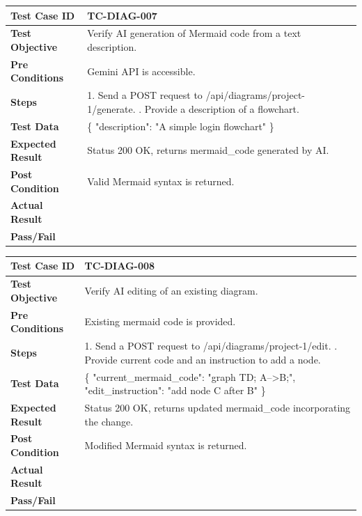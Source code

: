 \begin{longtable}{|p{}|p{}|}
\hline
\textbf{Test Case ID} & TC-DIAG-007 \\ \hline
\textbf{Test Objective} & Verify AI generation of Mermaid code from a text description. \\ \hline
\textbf{Pre Conditions} & Gemini API is accessible. \\ \hline
\textbf{Steps} & 
1. Send a POST request to /api/diagrams/project-1/generate. \newline
2. Provide a description of a flowchart. \\ \hline
\textbf{Test Data} & \{ "description": "A simple login flowchart" \} \\ \hline
\textbf{Expected Result} & Status 200 OK, returns mermaid\_code generated by AI. \\ \hline
\textbf{Post Condition} & Valid Mermaid syntax is returned. \\ \hline
\textbf{Actual Result} &  \\ \hline
\textbf{Pass/Fail} &  \\ \hline
\end{longtable}

\begin{longtable}{|p{}|p{}|}
\hline
\textbf{Test Case ID} & TC-DIAG-008 \\ \hline
\textbf{Test Objective} & Verify AI editing of an existing diagram. \\ \hline
\textbf{Pre Conditions} & Existing mermaid code is provided. \\ \hline
\textbf{Steps} & 
1. Send a POST request to /api/diagrams/project-1/edit. \newline
2. Provide current code and an instruction to add a node. \\ \hline
\textbf{Test Data} & \{ "current\_mermaid\_code": "graph TD; A-->B;", "edit\_instruction": "add node C after B" \} \\ \hline
\textbf{Expected Result} & Status 200 OK, returns updated mermaid\_code incorporating the change. \\ \hline
\textbf{Post Condition} & Modified Mermaid syntax is returned. \\ \hline
\textbf{Actual Result} &  \\ \hline
\textbf{Pass/Fail} &  \\ \hline
\end{longtable}

